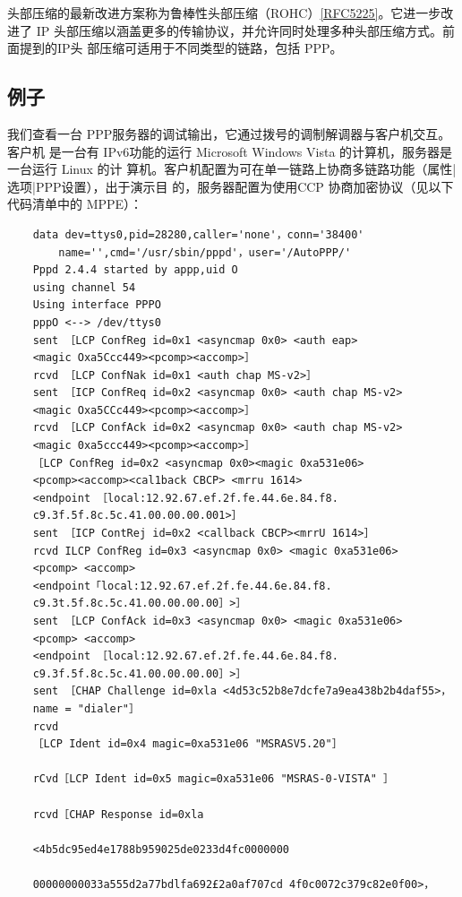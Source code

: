 头部压缩的最新改进方案称为鲁棒性头部压缩（ROHC）\href{https://www.rfc-editor.org/rfc/rfc5225}{[RFC5225]}。它进一步改进了
IP 头部压缩以涵盖更多的传输协议，并允许同时处理多种头部压缩方式。前面提到的IP头
部压缩可适用于不同类型的链路，包括 PPP。

\subsection{例子}

我们查看一台 PPP服务器的调试输出，它通过拨号的调制解调器与客户机交互。客户机
是一台有 IPv6功能的运行 Microsoft Windows Vista 的计算机，服务器是一台运行 Linux 的计
算机。客户机配置为可在单一链路上协商多链路功能（属性|选项|PPP设置），出于演示目
的，服务器配置为使用CCP 协商加密协议（见以下代码清单中的 MPPE）：

\begin{verbatim}
    data dev=ttys0,pid=28280,caller='none'，conn='38400'
        name='',cmd='/usr/sbin/pppd'，user='/AutoPPP/'
    Pppd 2.4.4 started by appp,uid O
    using channel 54
    Using interface PPPO
    pppO <--> /dev/ttys0
    sent ［LCP ConfReg id=0x1 <asyncmap 0x0> <auth eap>
    <magic Oxa5Ccc449><pcomp><accomp>］
    rcvd ［LCP ConfNak id=0x1 <auth chap MS-v2>］
    sent ［ICP ConfReq id=0x2 <asyncmap 0x0> <auth chap MS-v2>
    <magic Oxa5CCc449><pcomp><accomp>］
    rcvd ［LCP ConfAck id=0x2 <asyncmap 0x0> <auth chap MS-v2>
    <magic 0xa5ccc449><pcomp><accomp>］
    ［LCP ConfReg id=0x2 <asyncmap 0x0><magic 0xa531e06>
    <pcomp><accomp><cal1back CBCP> <mrru 1614>
    <endpoint ［local:12.92.67.ef.2f.fe.44.6e.84.f8.
    c9.3f.5f.8c.5c.41.00.00.00.001>］
    sent ［ICP ContRej id=0x2 <callback CBCP><mrrU 1614>］
    rcvd ILCP ConfReg id=0x3 <asyncmap 0x0> <magic 0xa531e06>
    <pcomp> <accomp>
    <endpoint「local:12.92.67.ef.2f.fe.44.6e.84.f8.
    c9.3t.5f.8c.5c.41.00.00.00.00］>］
    sent ［LCP ConfAck id=0x3 <asyncmap 0x0> <magic 0xa531e06>
    <pcomp> <accomp>
    <endpoint ［local:12.92.67.ef.2f.fe.44.6e.84.f8.
    c9.3f.5f.8c.5c.41.00.00.00.00］>］
    sent ［CHAP Challenge id=0xla <4d53c52b8e7dcfe7a9ea438b2b4daf55>，
    name = "dialer"］
    rcvd
    ［LCP Ident id=0x4 magic=0xa531e06 "MSRASV5.20"］

    rCvd［LCP Ident id=0x5 magic=0xa531e06 "MSRAS-0-VISTA" ］

    rcvd［CHAP Response id=0xla

    <4b5dc95ed4e1788b959025de0233d4fc0000000

    00000000033a555d2a77bdlfa692£2a0af707cd 4f0c0072c379c82e0f00>，


\end{verbatim}
